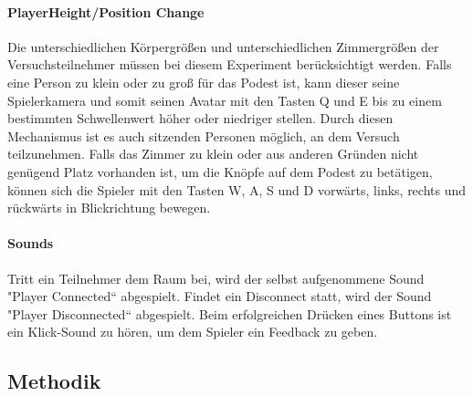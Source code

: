\documentclass[a4paper,11pt]{article}%
\renewcommand{\\}{\vspace*{0.5\baselineskip} \newline}
\begin{document}
\paragraph{PlayerHeight/Position Change}
Die unterschiedlichen Körpergrößen und unterschiedlichen Zimmergrößen der Versuchsteilnehmer müssen bei diesem Experiment berücksichtigt werden. Falls eine Person zu klein oder zu groß für das Podest ist, kann dieser seine Spielerkamera und somit seinen Avatar mit den Tasten Q und E bis zu einem bestimmten Schwellenwert höher oder niedriger stellen. Durch diesen Mechanismus ist es auch sitzenden Personen möglich, an dem Versuch teilzunehmen. Falls das Zimmer zu klein oder aus anderen Gründen nicht genügend Platz vorhanden ist, um die Knöpfe auf dem Podest zu betätigen, können sich die Spieler mit den Tasten W, A, S und D vorwärts, links, rechts und rückwärts in Blickrichtung bewegen.

\paragraph{Sounds}
Tritt ein Teilnehmer dem Raum bei, wird der selbst aufgenommene Sound "Player
Connected“ abgespielt. Findet ein Disconnect statt, wird der Sound "Player
Disconnected“ abgespielt. Beim erfolgreichen Drücken eines Buttons ist ein Klick-Sound zu hören, um dem Spieler ein Feedback zu geben. 

\newpage	
\subsection{Methodik}
\end{document}
